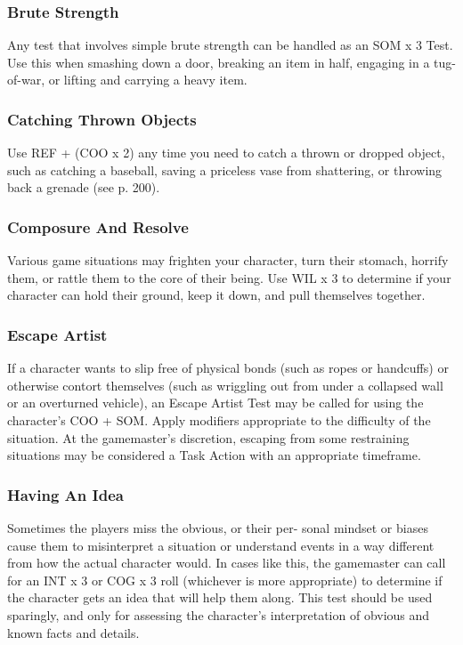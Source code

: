 \subsubsection{Brute Strength}

Any test that involves simple brute strength can be 
handled as an SOM x 3 Test. Use this when smashing 
down a door, breaking an item in half, engaging in a 
tug-of-war, or lifting and carrying a heavy item.

\subsubsection{Catching Thrown Objects}

Use REF + (COO x 2) any time you need to catch a 
thrown or dropped object, such as catching a baseball, 
saving a priceless vase from shattering, or throwing 
back a grenade (see p. 200).

\subsubsection{Composure And Resolve}

Various game situations may frighten your character, 
turn their stomach, horrify them, or rattle them to the 
core of their being. Use WIL x 3 to determine if your 
character can hold their ground, keep it down, and 
pull themselves together.

\subsubsection{Escape Artist}

If a character wants to slip free of physical bonds (such 
as ropes or handcuffs) or otherwise contort themselves 
(such as wriggling out from under a collapsed wall or 
an overturned vehicle), an Escape Artist Test may be 
called for using the character's COO + SOM. Apply 
modifiers appropriate to the difficulty of the situation. 
At the gamemaster's discretion, escaping from some 
restraining situations may be considered a Task Action 
with an appropriate timeframe.

\subsubsection{Having An Idea}

Sometimes the players miss the obvious, or their per-
sonal mindset or biases cause them to misinterpret a 
situation or understand events in a way different from 
how the actual character would. In cases like this, the 
gamemaster can call for an INT x 3 or COG x 3 roll 
(whichever is more appropriate) to determine if the 
character gets an idea that will help them along. This 
test should be used sparingly, and only for assessing 
the character's interpretation of obvious and known 
facts and details.

